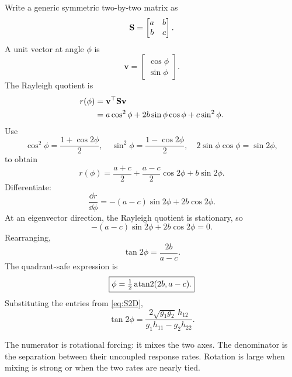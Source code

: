 Write a generic symmetric two-by-two matrix as
\begin{equation}
\mathbf{S}=
\begin{bmatrix}
a&b\\b&c
\end{bmatrix}.
\end{equation}
A unit vector at angle \(\phi\) is
\begin{equation}
\mathbf v=
\begin{bmatrix}\cos\phi\\\sin\phi\end{bmatrix}.
\end{equation}
The Rayleigh quotient is
\begin{align}
r(\phi)
&=\mathbf v^\top\mathbf{S}\mathbf v\\
&=a\cos^2\phi+2b\sin\phi\cos\phi+c\sin^2\phi.
\end{align}
Use
\begin{equation}
\cos^2\phi=\frac{1+\cos2\phi}{2},
\quad
\sin^2\phi=\frac{1-\cos2\phi}{2},
\quad
2\sin\phi\cos\phi=\sin2\phi,
\end{equation}
to obtain
\begin{equation}
r(\phi)=\frac{a+c}{2}+\frac{a-c}{2}\cos2\phi+b\sin2\phi.
\end{equation}
Differentiate:
\begin{equation}
\frac{\dd r}{\dd\phi}=-(a-c)\sin2\phi+2b\cos2\phi.
\end{equation}
At an eigenvector direction, the Rayleigh quotient is stationary, so
\begin{equation}
-(a-c)\sin2\phi+2b\cos2\phi=0.
\end{equation}
Rearranging,
\begin{equation}
\tan2\phi=\frac{2b}{a-c}.
\end{equation}
The quadrant-safe expression is
\begin{equation}
\boxed{\phi=\tfrac12\operatorname{atan2}(2b,a-c).}
\label{eq:2DeigenAngle}
\end{equation}
Substituting the entries from \cref{eq:S2D},
\begin{equation}
\boxed{
\tan2\phi=
\frac{2\sqrt{g_1g_2}\,h_{12}}
{g_1h_{11}-g_2h_{22}}.}
\label{eq:2DchannelAngle}
\end{equation}

\begin{mathteach}
The numerator is rotational forcing: it mixes the two axes. The denominator is the separation between their uncoupled response rates. Rotation is large when mixing is strong or when the two rates are nearly tied.
\end{mathteach}

